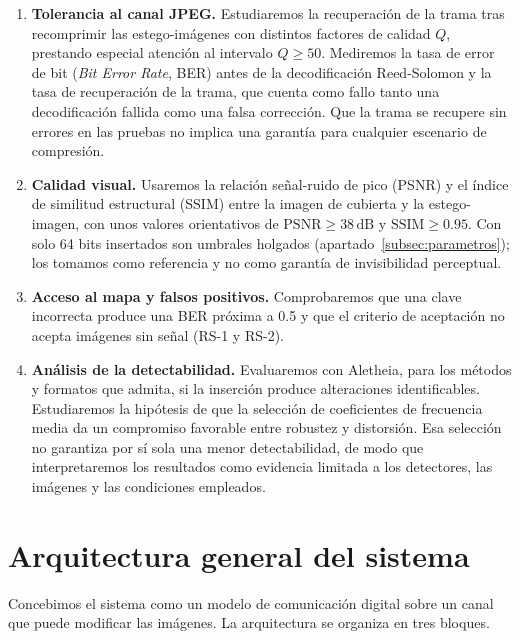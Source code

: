 \documentclass[IB]{TFUOC}%
\begin{document}
\begin{enumerate}
    \item \textbf{Tolerancia al canal JPEG.} Estudiaremos la recuperación de la trama tras recomprimir las estego-imágenes con distintos factores de calidad $Q$, prestando especial atención al intervalo $Q \geq 50$. Mediremos la tasa de error de bit (\textit{Bit Error Rate}, BER) antes de la decodificación Reed-Solomon y la tasa de recuperación de la trama, que cuenta como fallo tanto una decodificación fallida como una falsa corrección. Que la trama se recupere sin errores en las pruebas no implica una garantía para cualquier escenario de compresión.

    \item \textbf{Calidad visual.} Usaremos la relación señal-ruido de pico (PSNR) y el índice de similitud estructural (SSIM) entre la imagen de cubierta y la estego-imagen, con unos valores orientativos de $\mathrm{PSNR}\geq 38\,\mathrm{dB}$ y $\mathrm{SSIM}\geq 0{.}95$. Con solo 64 bits insertados son umbrales holgados (apartado~\ref{subsec:parametros}); los tomamos como referencia y no como garantía de invisibilidad perceptual.

    \item \textbf{Acceso al mapa y falsos positivos.} Comprobaremos que una clave incorrecta produce una BER próxima a 0.5 y que el criterio de aceptación no acepta imágenes sin señal (RS-1 y RS-2).

    \item \textbf{Análisis de la detectabilidad.} Evaluaremos con Aletheia, para los métodos y formatos que admita, si la inserción produce alteraciones identificables. Estudiaremos la hipótesis de que la selección de coeficientes de frecuencia media da un compromiso favorable entre robustez y distorsión. Esa selección no garantiza por sí sola una menor detectabilidad, de modo que interpretaremos los resultados como evidencia limitada a los detectores, las imágenes y las condiciones empleados.
\end{enumerate}

\section{Arquitectura general del sistema}
\label{sec:arquitectura_general}

Concebimos el sistema como un modelo de comunicación digital sobre un canal que puede modificar las imágenes. La arquitectura se organiza en tres bloques.
\end{document}
